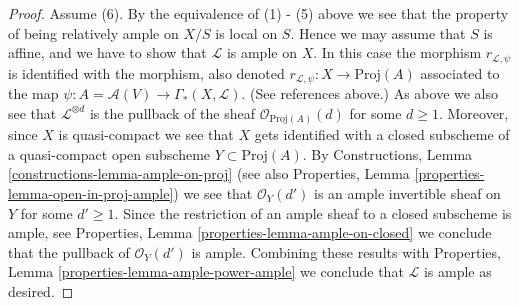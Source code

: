 \documentclass[10pt,a4paper]{amsart}
\theoremstyle{plain}
\theoremstyle{definition}
\theoremstyle{remark}
\numberwithin{equation}{subsection}
\begin{document}
\begin{proof}
\medskip\noindent
Assume (6). By the equivalence of (1) - (5) above we see that the
property of being relatively ample on $X/S$ is local on $S$. Hence
we may assume that $S$ is affine, and we have to show that
$\mathcal{L}$ is ample on $X$. In this case the morphism
$r_{\mathcal{L}, \psi}$ is identified with the morphism, also denoted
$r_{\mathcal{L}, \psi} : X \to \text{Proj}(A)$ associated to the map
$\psi : A = \mathcal{A}(V) \to \Gamma_*(X, \mathcal{L})$.
(See references above.) As above we also see that
$\mathcal{L}^{\otimes d}$ is the pullback of the sheaf
$\mathcal{O}_{\text{Proj}(A)}(d)$ for some $d \geq 1$.
Moreover, since $X$ is quasi-compact we
see that $X$ gets identified with a closed subscheme of a
quasi-compact open subscheme $Y \subset \text{Proj}(A)$.
By
Constructions, Lemma
\ref{constructions-lemma-ample-on-proj}
(see also
Properties, Lemma
\ref{properties-lemma-open-in-proj-ample})
we see that $\mathcal{O}_Y(d')$ is an ample invertible sheaf on
$Y$ for some $d' \geq 1$. Since the restriction of an ample
sheaf to a closed subscheme is ample, see
Properties, Lemma
\ref{properties-lemma-ample-on-closed}
we conclude that the pullback of
$\mathcal{O}_Y(d')$ is ample. Combining these results with
Properties, Lemma
\ref{properties-lemma-ample-power-ample}
we conclude that $\mathcal{L}$ is ample as desired.
\end{proof}
\end{document}
